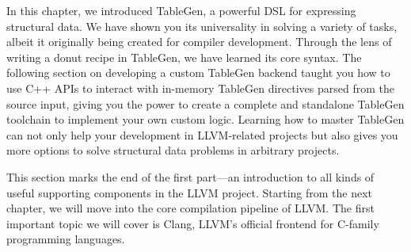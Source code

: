 In this chapter, we introduced TableGen, a powerful DSL for expressing structural data. We have shown you its universality in solving a variety of tasks, albeit it originally being created for compiler development. Through the lens of writing a donut recipe in TableGen, we have learned its core syntax. The following section on developing a custom TableGen backend taught you how to use C++ APIs to interact with in-memory TableGen directives parsed from the source input, giving you the power to create a complete and standalone TableGen toolchain to implement your own custom logic. Learning how to master TableGen can not only help your development in LLVM-related projects but also gives you more options to solve structural data problems in arbitrary projects.

This section marks the end of the first part—an introduction to all kinds of useful supporting components in the LLVM project. Starting from the next chapter, we will move into the core compilation pipeline of LLVM. The first important topic we will cover is Clang, LLVM's official frontend for C-family programming languages.